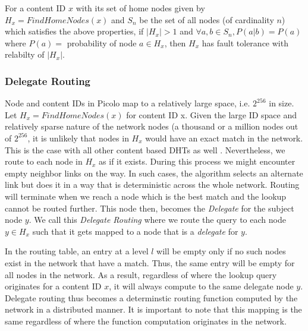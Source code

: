 \begin{theorem}
   
    For a content ID \(x\) with its set of home nodes given by \( H_x = FindHomeNodes(x) \) and \(S_n\) be the set of
all nodes (of cardinality \(n\)) which satisfies the above properties, if \( |H_x| > 1 \) and \( \forall a, b \in S_n,
    P(a|b) = P(a) \) where \( P(a) = \) probability of node \(a \in H_x \), then \(H_x\) has fault tolerance with
    relabilty of \( | H_x | \).
\end{theorem}

\subsubsection{Delegate Routing}

Node and content IDs in Picolo map to a relatively large space, i.e. \(2^{256}\) in size. Let \( H_x =
FindHomeNodes(x)\) for content ID x. Given the large ID space and relatively sparse nature of the network nodes (a
thousand or a million nodes out of \(2^{256}\), it is unlikely that nodes in \(H_x\) would have an exact match in the
network. This is the case with all other content based DHTs as well \cite{Stoica_2001, Rowstron_2001, tapestry2004}.
Nevertheless, we route to each node in \(H_x\) as if it exists. During this process we might encounter empty neighbor
links on the way. In such cases, the algorithm selects an alternate link but does it in a way that is deterministic
across the whole network. Routing will terminate when we reach a node which is the best match and the lookup cannot be
routed further. This node then, becomes the {\em Delegate} for the subject node \(y\). We call this {\em Delegate
Routing} where we route the query to each node \(y \in H_x \) such that it gets mapped to a node that is a {\em
delegate} for \(y\).

In the routing table, an entry at a level \(l\) will be empty only if no such nodes exist in the network that have a
match. Thus, the same entry will be empty for all nodes in the network. As a result, regardless of where the lookup
query originates for a content ID \(x\), it will always compute to the same delegate node \(y\). Delegate routing thus
becomes a determinstic routing function computed by the network in a distributed manner. It is important to note that
this mapping is the same regardless of where the function computation originates in the network.

